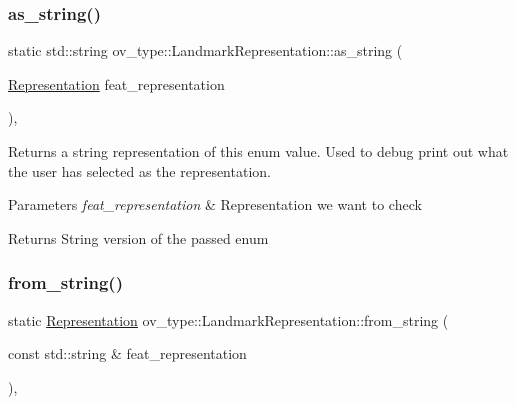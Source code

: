 \subsubsection{\texorpdfstring{as\+\_\+string()}{as\_string()}}
{\footnotesize\ttfamily static std\+::string ov\+\_\+type\+::\+Landmark\+Representation\+::as\+\_\+string (\begin{DoxyParamCaption}\item[{\hyperlink{classov__type_1_1LandmarkRepresentation_a7f5783df6932ace7f098ae243b6d298e}{Representation}}]{feat\+\_\+representation }\end{DoxyParamCaption})\hspace{0.3cm}{\ttfamily [inline]}, {\ttfamily [static]}}



Returns a string representation of this enum value. Used to debug print out what the user has selected as the representation. 


\begin{DoxyParams}{Parameters}
{\em feat\+\_\+representation} & Representation we want to check \\
\hline
\end{DoxyParams}
\begin{DoxyReturn}{Returns}
String version of the passed enum 
\end{DoxyReturn}
\mbox{\label{classov__type_1_1LandmarkRepresentation_a730830f7d0235f40f4266d0a66895e50}} 
\subsubsection{\texorpdfstring{from\+\_\+string()}{from\_string()}}
{\footnotesize\ttfamily static \hyperlink{classov__type_1_1LandmarkRepresentation_a7f5783df6932ace7f098ae243b6d298e}{Representation} ov\+\_\+type\+::\+Landmark\+Representation\+::from\+\_\+string (\begin{DoxyParamCaption}\item[{const std\+::string \&}]{feat\+\_\+representation }\end{DoxyParamCaption})\hspace{0.3cm}{\ttfamily [inline]}, {\ttfamily [static]}}



